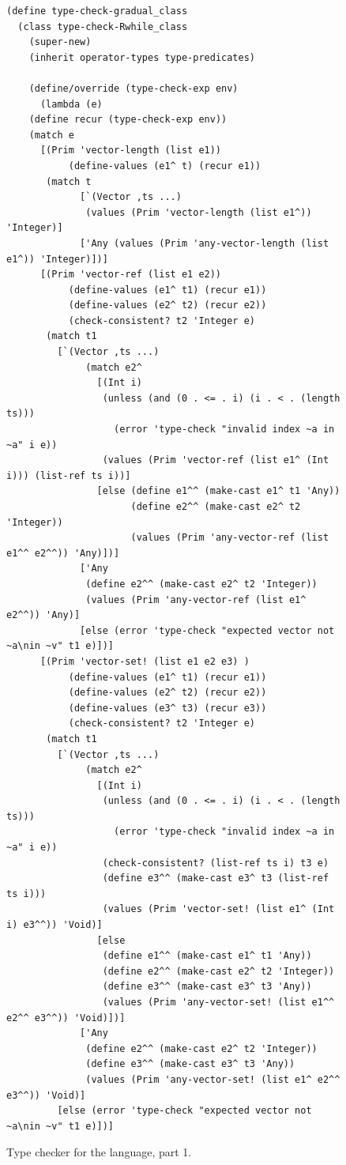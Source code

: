 \documentclass[7x10,nocrop]{TimesAPriori_MIT}%
\begin{document}
\begin{figure}[tbp]
\begin{lstlisting}[basicstyle=\ttfamily\scriptsize]
(define type-check-gradual_class
  (class type-check-Rwhile_class
    (super-new)
    (inherit operator-types type-predicates)

    (define/override (type-check-exp env)
      (lambda (e)
	(define recur (type-check-exp env))
	(match e
	  [(Prim 'vector-length (list e1))
           (define-values (e1^ t) (recur e1))
	   (match t
             [`(Vector ,ts ...)
              (values (Prim 'vector-length (list e1^)) 'Integer)]
             ['Any (values (Prim 'any-vector-length (list e1^)) 'Integer)])]
	  [(Prim 'vector-ref (list e1 e2))
           (define-values (e1^ t1) (recur e1))
           (define-values (e2^ t2) (recur e2))
           (check-consistent? t2 'Integer e)
	   (match t1
	     [`(Vector ,ts ...)
              (match e2^
                [(Int i)
                 (unless (and (0 . <= . i) (i . < . (length ts)))
                   (error 'type-check "invalid index ~a in ~a" i e))
                 (values (Prim 'vector-ref (list e1^ (Int i))) (list-ref ts i))]
                [else (define e1^^ (make-cast e1^ t1 'Any))
                      (define e2^^ (make-cast e2^ t2 'Integer))
                      (values (Prim 'any-vector-ref (list e1^^ e2^^)) 'Any)])]
             ['Any
              (define e2^^ (make-cast e2^ t2 'Integer))
              (values (Prim 'any-vector-ref (list e1^ e2^^)) 'Any)]
             [else (error 'type-check "expected vector not ~a\nin ~v" t1 e)])]
	  [(Prim 'vector-set! (list e1 e2 e3) )
           (define-values (e1^ t1) (recur e1))
           (define-values (e2^ t2) (recur e2))
           (define-values (e3^ t3) (recur e3))
           (check-consistent? t2 'Integer e)
	   (match t1
	     [`(Vector ,ts ...)
              (match e2^
                [(Int i)
                 (unless (and (0 . <= . i) (i . < . (length ts)))
                   (error 'type-check "invalid index ~a in ~a" i e))
                 (check-consistent? (list-ref ts i) t3 e)
                 (define e3^^ (make-cast e3^ t3 (list-ref ts i)))
                 (values (Prim 'vector-set! (list e1^ (Int i) e3^^)) 'Void)]
                [else
                 (define e1^^ (make-cast e1^ t1 'Any))
                 (define e2^^ (make-cast e2^ t2 'Integer))
                 (define e3^^ (make-cast e3^ t3 'Any))
                 (values (Prim 'any-vector-set! (list e1^^ e2^^ e3^^)) 'Void)])]
             ['Any
              (define e2^^ (make-cast e2^ t2 'Integer))
              (define e3^^ (make-cast e3^ t3 'Any))
              (values (Prim 'any-vector-set! (list e1^ e2^^ e3^^)) 'Void)]
	     [else (error 'type-check "expected vector not ~a\nin ~v" t1 e)])]
\end{lstlisting}
\caption{Type checker for the \LangGrad{} language, part 1.}
\label{fig:type-check-Rgradual-1}
\end{figure}
\end{document}
